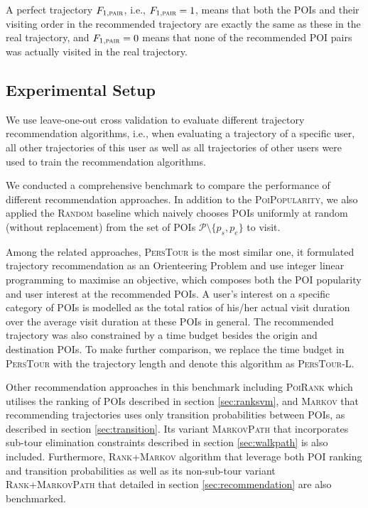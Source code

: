 A perfect trajectory $F_{1,\textsc{pair}}$, i.e., $F_{1,\textsc{pair}} = 1$, means that both the POIs and their visiting order in the
recommended trajectory are exactly the same as these in the real trajectory,
and $F_{1,\textsc{pair}} = 0$ means that none of the recommended POI pairs was actually visited in the real trajectory.


\subsection{Experimental Setup}
We use leave-one-out cross validation to evaluate different trajectory recommendation algorithms,
i.e., when evaluating a trajectory of a specific user, all other trajectories of this user as well as
all trajectories of other users were used to train the recommendation algorithms.

We conducted a comprehensive benchmark to compare the performance of different recommendation approaches.
In addition to the \textsc{PoiPopularity}, we also applied the \textsc{Random} baseline which naively chooses 
POIs uniformly at random (without replacement) from the set of POIs $\mathcal{P} \setminus \{p_s, p_e \}$ to visit.

Among the related approaches, \textsc{PersTour}\cite{ijcai15} is the most similar one, it formulated 
trajectory recommendation as an Orienteering Problem and use integer linear programming to maximise 
an objective, which composes both the POI popularity and user interest at the recommended POIs.
A user's interest on a specific category of POIs is modelled as the total ratios of his/her actual visit duration 
over the average visit duration at these POIs in general.
The recommended trajectory was also constrained by a time budget besides the origin and destination POIs.
To make further comparison, we replace the time budget in \textsc{PersTour} with the trajectory length and
denote this algorithm as \textsc{PersTour-L}.

Other recommendation approaches in this benchmark including \textsc{PoiRank} which utilises the ranking of POIs
described in section \ref{sec:ranksvm}, and \textsc{Markov} that recommending trajectories uses only transition 
probabilities between POIs, as described in section \ref{sec:transition}. Its variant \textsc{MarkovPath} that incorporates 
sub-tour elimination constraints described in section \ref{sec:walkpath} is also included.
Furthermore, \textsc{Rank+Markov} algorithm that leverage both POI ranking and transition probabilities as well as
its non-sub-tour variant \textsc{Rank+MarkovPath} that detailed in section \ref{sec:recommendation} are also 
benchmarked.

